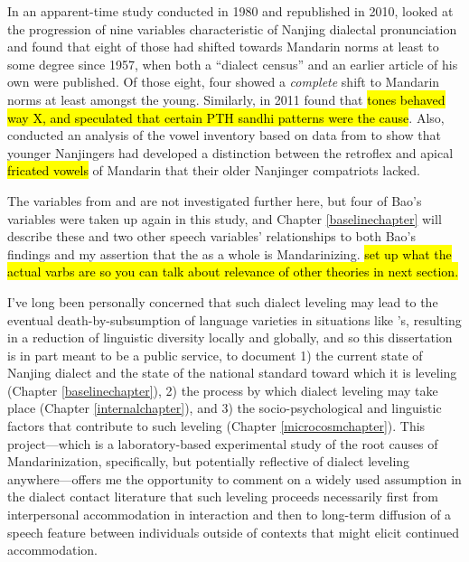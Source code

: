     In an apparent-time study conducted in 1980 and republished in 2010, \citeauthor{bao1980sixty} looked at the progression of nine variables characteristic of Nanjing dialectal pronunciation and found that eight of those had shifted towards Mandarin norms at least to some degree since 1957, when both a ``dialect census'' and an earlier article of his own were published. Of those eight, four showed a \emph{complete} shift to Mandarin norms at least amongst the young. Similarly, in 2011 \citeauthor{chen2011differences} found that \hl{tones behaved way X, and speculated that certain PTH sandhi patterns were the cause}. Also, \cite{coles2017mandarinization} conducted an analysis of the \ND{} vowel inventory based on data from \cite{coles2014investigation} to show that younger Nanjingers had developed a distinction between the retroflex and apical \hl{fricated vowels} of Mandarin that their older Nanjinger compatriots lacked.
    
    The variables from \cite{chen2011differences} and \cite{coles2014investigation,coles2017mandarinization} are not investigated further here, but four of Bao's variables were taken up again in this study, and Chapter \ref{baselinechapter} will describe these and two other speech variables' relationships to both Bao's findings and my assertion that the \ND{} as a whole is Mandarinizing. \hl{set up what the actual varbs are so you can talk about relevance of other theories in next section.}
    
    I've long been personally concerned that such dialect leveling may lead to the eventual death-by-subsumption of language varieties in situations like \ND{}'s, resulting in a reduction of linguistic diversity locally and globally, and so this dissertation is in part meant to be a public service, to document 1) the current state of Nanjing dialect and the state of the national standard toward which it is leveling (Chapter \ref{baselinechapter}), 2) the process by which dialect leveling may take place (Chapter \ref{internalchapter}), and 3) the socio-psychological and linguistic factors that contribute to such leveling (Chapter \ref{microcosmchapter}). This project---which is a laboratory-based experimental study of the root causes of Mandarinization, specifically, but potentially reflective of dialect leveling anywhere---offers me the opportunity to comment on a widely used assumption in the dialect contact literature that such leveling proceeds necessarily first from interpersonal accommodation in interaction and then to long-term diffusion of a speech feature between individuals outside of contexts that might elicit continued accommodation. 
    
